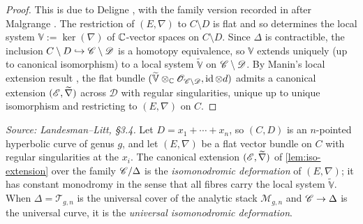 \begin{proof}
  This is due to Deligne \cite{deligne:regular-singular}, with the family version
  recorded in \cite[Theorem 3.4]{Heu:universal-isomonodromic} after Malgrange
  \cite{malgrange:I, malgrange:II}. The restriction of $(E,\nabla)$ to
  $C \setminus D$ is flat and so determines the local system
  $\mathbb{V} := \ker(\nabla)$ of $\mathbb{C}$-vector spaces on $C \setminus D$. Since
  $\Delta$ is contractible, the inclusion
  $C \setminus D \hookrightarrow \mathscr{C} \setminus \mathscr{D}$ is a homotopy
  equivalence, so $\mathbb{V}$ extends uniquely (up to canonical isomorphism) to
  a local system $\widetilde{\mathbb{V}}$ on $\mathscr{C} \setminus \mathscr{D}$. By
  Manin's local extension result
  \cite[Proposition 5.4]{deligne:regular-singular}, the flat bundle
  $(\widetilde{\mathbb{V}} \otimes_{\mathbb{C}} \mathscr{O}_{\mathscr{C} \setminus \mathscr{D}},
  \operatorname{id} \otimes d)$ admits a canonical extension
  $(\mathscr{E},\widetilde{\nabla})$ across $\mathscr{D}$ with regular singularities,
  unique up to unique isomorphism and restricting to $(E,\nabla)$ on $C$.
\end{proof}

\begin{definition}
  \label{def:isomonodromy}
  \textit{Source: Landesman--Litt, \S3.4.}
  Let $D = x_1 + \cdots + x_n$, so $(C,D)$ is an $n$-pointed hyperbolic curve of
  genus $g$, and let $(E,\nabla)$ be a flat vector bundle on $C$ with regular
  singularities at the $x_i$. The canonical extension $(\mathscr{E},\widetilde{\nabla})$
  of \cref{lem:iso-extension} over the family $\mathscr{C}/\Delta$ is the
  \emph{isomonodromic deformation} of $(E,\nabla)$; it has constant monodromy in
  the sense that all fibres carry the local system $\widetilde{\mathbb{V}}$. When
  $\Delta = \mathscr{T}_{g,n}$ is the universal cover of the analytic stack
  $\mathscr{M}_{g,n}$ and $\mathscr{C} \to \Delta$ is the universal curve, it is the
  \emph{universal isomonodromic deformation}.
\end{definition}

